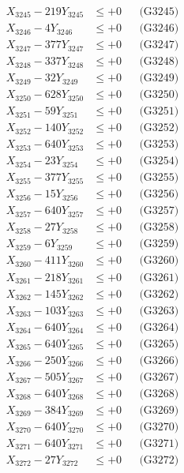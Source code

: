 \documentclass[a4paper,10pt]{article}
\begin{document}
{\begin{align}
X_{3245} - 219Y_{3245} &\leq +0 && \text{(G3245)} \\
X_{3246} - 4Y_{3246} &\leq +0 && \text{(G3246)} \\
X_{3247} - 377Y_{3247} &\leq +0 && \text{(G3247)} \\
X_{3248} - 337Y_{3248} &\leq +0 && \text{(G3248)} \\
X_{3249} - 32Y_{3249} &\leq +0 && \text{(G3249)} \\
X_{3250} - 628Y_{3250} &\leq +0 && \text{(G3250)} \\
\allowbreak
X_{3251} - 59Y_{3251} &\leq +0 && \text{(G3251)} \\
X_{3252} - 140Y_{3252} &\leq +0 && \text{(G3252)} \\
X_{3253} - 640Y_{3253} &\leq +0 && \text{(G3253)} \\
X_{3254} - 23Y_{3254} &\leq +0 && \text{(G3254)} \\
X_{3255} - 377Y_{3255} &\leq +0 && \text{(G3255)} \\
X_{3256} - 15Y_{3256} &\leq +0 && \text{(G3256)} \\
X_{3257} - 640Y_{3257} &\leq +0 && \text{(G3257)} \\
X_{3258} - 27Y_{3258} &\leq +0 && \text{(G3258)} \\
X_{3259} - 6Y_{3259} &\leq +0 && \text{(G3259)} \\
X_{3260} - 411Y_{3260} &\leq +0 && \text{(G3260)} \\
\allowbreak
X_{3261} - 218Y_{3261} &\leq +0 && \text{(G3261)} \\
X_{3262} - 145Y_{3262} &\leq +0 && \text{(G3262)} \\
X_{3263} - 103Y_{3263} &\leq +0 && \text{(G3263)} \\
X_{3264} - 640Y_{3264} &\leq +0 && \text{(G3264)} \\
X_{3265} - 640Y_{3265} &\leq +0 && \text{(G3265)} \\
X_{3266} - 250Y_{3266} &\leq +0 && \text{(G3266)} \\
X_{3267} - 505Y_{3267} &\leq +0 && \text{(G3267)} \\
X_{3268} - 640Y_{3268} &\leq +0 && \text{(G3268)} \\
X_{3269} - 384Y_{3269} &\leq +0 && \text{(G3269)} \\
X_{3270} - 640Y_{3270} &\leq +0 && \text{(G3270)} \\
\allowbreak
X_{3271} - 640Y_{3271} &\leq +0 && \text{(G3271)} \\
X_{3272} - 27Y_{3272} &\leq +0 && \text{(G3272)} \\

\end{align}}
\end{document}
